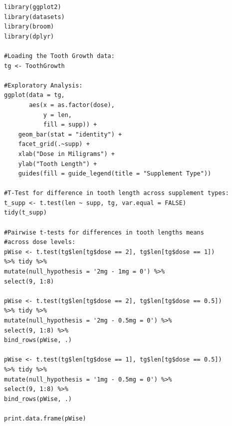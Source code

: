 \documentclass[a4paper]{article}
\begin{document}
\begin{small}
\begin{lstlisting}[frame = single]
library(ggplot2)
library(datasets)
library(broom)
library(dplyr)

#Loading the Tooth Growth data:
tg <- ToothGrowth

#Exploratory Analysis:
ggplot(data = tg,
       aes(x = as.factor(dose),
           y = len,
           fill = supp)) +
    geom_bar(stat = "identity") +
    facet_grid(.~supp) +
    xlab("Dose in Miligrams") +
    ylab("Tooth Length") +
    guides(fill = guide_legend(title = "Supplement Type"))

#T-Test for difference in tooth length across supplement types:
t_supp <- t.test(len ~ supp, tg, var.equal = FALSE)
tidy(t_supp)

#Pairwise t-tests for differences in tooth lengths means 
#across dose levels:
pWise <- t.test(tg$len[tg$dose == 2], tg$len[tg$dose == 1]) 
%>% tidy %>%
mutate(null_hypothesis = '2mg - 1mg = 0') %>%
select(9, 1:8)

pWise <- t.test(tg$len[tg$dose == 2], tg$len[tg$dose == 0.5]) 
%>% tidy %>%
mutate(null_hypothesis = '2mg - 0.5mg = 0') %>%
select(9, 1:8) %>%
bind_rows(pWise, .)

pWise <- t.test(tg$len[tg$dose == 1], tg$len[tg$dose == 0.5]) 
%>% tidy %>%
mutate(null_hypothesis = '1mg - 0.5mg = 0') %>%
select(9, 1:8) %>%
bind_rows(pWise, .)

print.data.frame(pWise)
\end{lstlisting}
\end{small}
\end{document}
